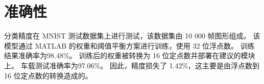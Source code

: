 


\section{准确性}

分类精度在 MNIST 测试数据集上进行测试，该数据集由 10 000 帧图形组成。
该模型通过 MATLAB 的权重和阈值平衡方案进行训练，使用 32 位浮点数。
训练结果准确率为98.48\%。 训练后的权重被转换为 16 位定点数并部署在建议的模块上。
车载测试准确率为97.06\%。 
因此，精度损失了 1.42\%，这主要是由浮点数到 16 位定点数的转换造成的。





